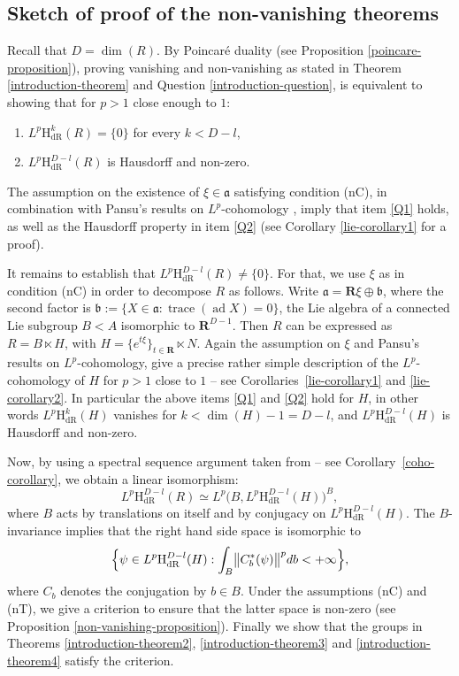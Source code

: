 \documentclass[JEP,XML,SOM,Unicode,published]{cedram}
\newcommand{\dR}{\mathrm{dR}}
\newcommand{\rH}{\mathrm{H}}
\newcommand{\fra}{\mathfrak{a}}
\newcommand{\frb}{\mathfrak{b}}
\newcommand{\RR}{\mathbf{R}}
\theoremstyle{plain}
\theoremstyle{remark}
\theoremstyle{definition}
\DeclareMathOperator{\ad}{ad}
\DeclareMathOperator{\trace}{trace}
\begin{document}
\subsection{Sketch of proof of the non-vanishing theorems}
\label{introduction-strategy}
Recall that $D = \dim(R)$.
By Poincaré duality (see Proposition \ref{poincare-proposition}), proving vanishing and non-vanishing as stated in
Theorem \ref{introduction-theorem} and Question \ref{introduction-question}, is equivalent to showing
that for $p > 1$ close enough to $1$:
\begin{enumerate}
\item\label{Q1} $L^p\rH_\dR^k(R) = \{0\}$ for every $k <D-l$,

\smallskip
\item\label{Q2} $L^p\rH_\dR^{D-l}(R)$ is Hausdorff and non-zero.
\end{enumerate}
The assumption on the existence of $\xi \in \fra$ satisfying condition (nC), in combination with Pansu's results on $L^p$\nobreakdash-cohomology \cite{Pa99, P1, Pa09},
imply that item \eqref{Q1} holds, as well as the Hausdorff property in item \eqref{Q2}
(see Corollary \ref{lie-corollary1} for a proof).

It remains to establish that $L^p\rH_\dR^{D-l}(R) \neq \{0\}$. For that, we use $\xi$ as in condition (nC) in order to decompose $R$ as follows.
Write $\fra = \RR \xi \oplus \frb$,
where the second factor is $\frb:=\{X \in \fra: \trace(\ad X) = 0\}$, the Lie algebra of a connected
Lie subgroup $B < A$ isomorphic to $\RR^{D-1}$.
Then $R$ can be expressed as $R = B \ltimes H$, with $H = \{e^{t\xi}\}_{t \in \RR} \ltimes N$.
Again the assumption on $\xi$ and Pansu's results on
$L^p$\nobreakdash-cohomology, give a precise rather simple description of the $L^p$\nobreakdash-cohomology of $H$
for $p > 1$ close to $1$ -- see Corollaries~\ref{lie-corollary1} and \ref{lie-corollary2}. In particular the above items \eqref{Q1} and \eqref{Q2} hold for $H$,
in other words
$L^p\rH_\dR^{k} (H)$ vanishes for $k < \dim(H) -1 = D-l$, and $L^p\rH_\dR^{D-l} (H)$ is Hausdorff and non-zero.

Now, by using a spectral sequence argument taken from \cite{BR} -- see Corollary~\ref{coho-corollary}, we obtain a linear isomorphism:
\begin{equation}\label{introduction-eqn}
L^p\rH_\dR^{D-l}(R) \simeq L^p \bigl(B, L^p\rH_\dR^{D-l} (H)\bigr)^B,
\end{equation}
where $B$ acts by translations on itself and by conjugacy on $L^p\rH_\dR^{D-l} (H)$.
The $B$\nobreakdash-invariance implies that the right hand side space is isomorphic to
\[\Bigl\{\psi \in L^p\rH_\dR^{D-l} (H): \int_{B} \bigl\Vert C_{b}^* (\psi) \bigr\Vert^p db < +\infty \Bigr\},\]
where $C_b$ denotes the conjugation by $b \in B$.
Under the assumptions (nC) and (nT), we give a criterion to ensure that the latter space is non-zero (see Proposition \ref{non-vanishing-proposition}).
Finally we show that the groups in Theorems \ref{introduction-theorem2}, \ref{introduction-theorem3} and \ref{introduction-theorem4}
satisfy the criterion.
\end{document}
